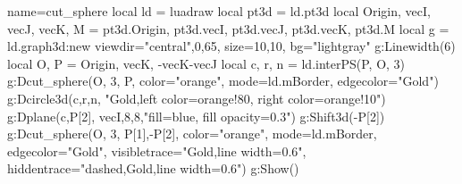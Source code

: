 \begin{luadraw}{name=cut_sphere}
local ld = luadraw
local pt3d = ld.pt3d
local Origin, vecI, vecJ, vecK, M = pt3d.Origin, pt3d.vecI, pt3d.vecJ, pt3d.vecK, pt3d.M
local g = ld.graph3d:new{ viewdir={"central",0,65}, size={10,10}, bg="lightgray"}
g:Linewidth(6)
local O, P = Origin, {vecK, -vecK-vecJ}
local c, r, n = ld.interPS(P, {O, 3})
g:Dcut_sphere(O, 3, P, {color="orange", mode=ld.mBorder, edgecolor="Gold"})
g:Dcircle3d(c,r,n, "Gold,left color=orange!80, right color=orange!10")
g:Dplane({c,P[2]}, vecI,8,8,"fill=blue, fill opacity=0.3")
g:Shift3d(-P[2])
g:Dcut_sphere(O, 3, {P[1],-P[2]}, 
    {color="orange", mode=ld.mBorder, edgecolor="Gold", visibletrace="Gold,line width=0.6", hiddentrace="dashed,Gold,line width=0.6"})
g:Show()
\end{luadraw}
